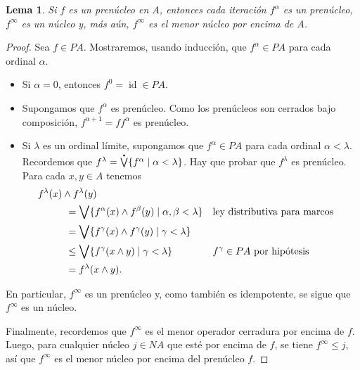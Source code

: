 \documentclass[12pt,letterpaper,titlepage]{article}
\newtheorem*{lemma}{Lema}
\theoremstyle{definition}
\newcommand\Sup{\bigvee}
\renewcommand\inf{\wedge}
\newcommand\pSup{%
    {\stackrel{\raisebox{-3pt}{\scalebox{0.5}{$\bullet$}}}{\bigvee}}
  }%
\newcommand\<{\langle}
\renewcommand\>{\rangle}
\DeclareMathOperator{\id}{id}
\begin{document}
\begin{lemma}
  Si $f$ es un prenúcleo en $A$, entonces cada iteración
  $f^\alpha$ es un prenúcleo, $f^\infty$ es un núcleo y, más aún,
  $f^\infty$ es el menor núcleo por encima de $A$.
\end{lemma}
\begin{proof}
  Sea $f\in PA$.
  Mostraremos, usando inducción, que $f^\alpha\in PA$ para cada
  ordinal $\alpha$.
  \begin{itemize}
    \item Si $\alpha=0$, entonces $f^0=\id\in PA$.
    \item Supongamos que $f^\alpha$ es prenúcleo.
    Como los prenúcleos son cerrados bajo composición,
    $f^{\alpha+1}=ff^\alpha$ es prenúcleo.
    \item Si $\lambda$ es un ordinal límite, supongamos que
    $f^\alpha\in PA$ para cada ordinal $\alpha<\lambda$.
    Recordemos que
    $f^\lambda=\pSup\{f^\alpha\mid\alpha<\lambda\}$.
    Hay que probar que $f^\lambda$ es prenúcleo.
    Para cada $x,y\in A$ tenemos
    \begin{align*}
      &f^\lambda(x) \inf f^\lambda(y) \\
      &\hspace{10mm}
      = \Sup\{f^\alpha(x) \inf f^\beta(y) \mid
        \alpha,\beta<\lambda\}
        && \text{ley distributiva para marcos} \\
      &\hspace{10mm}
      = \Sup\{f^\gamma(x)\inf f^\gamma(y)
        \mid \gamma<\lambda\} \\
      &\hspace{10mm}
      \leq \Sup\{f^\gamma(x\inf y) \mid \gamma<\lambda\}
        && f^\gamma\in PA \text{ por hipótesis}\\
      &\hspace{10mm}
      = f^\lambda(x\inf y).
    \end{align*}
  \end{itemize}
  En particular, $f^\infty$ es un prenúcleo y, como también es
  idempotente, se sigue que $f^\infty$ es un núcleo.

  Finalmente, recordemos que $f^\infty$ es el menor operador
  cerradura por encima de $f$.
  Luego, para cualquier núcleo $j\in NA$ que esté por encima de
  $f$, se tiene $f^\infty\leq j$, así que $f^\infty$ es el menor
  núcleo por encima del prenúcleo $f$.
\end{proof}
\end{document}
